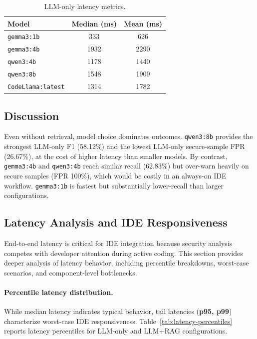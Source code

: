 \begin{table}[H]
  \centering
  \caption{LLM-only latency metrics.}
  \label{tab:eval-llm-only-latency}
  \small
  \begin{tabular}{lcc}
    \toprule
    Model & Median (ms) & Mean (ms) \\
    \midrule
    \texttt{gemma3:1b} & 333 & 626 \\
    \texttt{gemma3:4b} & 1932 & 2290 \\
    \texttt{qwen3:4b} & 1178 & 1440 \\
    \texttt{qwen3:8b} & 1548 & 1909 \\
    \texttt{CodeLlama:latest} & 1314 & 1782 \\
    \bottomrule
  \end{tabular}
\end{table}

\subsection*{Discussion}

Even without retrieval, model choice dominates outcomes. \texttt{qwen3:8b} provides the strongest LLM-only F1 (58.12\%) and the lowest LLM-only secure-sample FPR (26.67\%), at the cost of higher latency than smaller models. By contrast, \texttt{gemma3:4b} and \texttt{qwen3:4b} reach similar recall (62.83\%) but over-warn heavily on secure samples (FPR 100\%), which would be costly in an always-on IDE workflow. \texttt{gemma3:1b} is fastest but substantially lower-recall than larger configurations.

\subsection{Latency Analysis and IDE Responsiveness}
\label{sec:eval-latency-analysis}

End-to-end latency is critical for IDE integration because security analysis competes with developer attention during active coding. This section provides deeper analysis of latency behavior, including percentile breakdowns, worst-case scenarios, and component-level bottlenecks.

\paragraph{Percentile latency distribution.}
While median latency indicates typical behavior, tail latencies (\textbf{p95, p99}) characterize worst-case IDE responsiveness. Table~\ref{tab:latency-percentiles} reports latency percentiles for LLM-only and LLM+RAG configurations.

